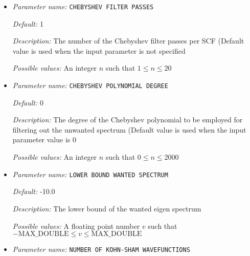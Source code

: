 \begin{itemize}
\item {\it Parameter name:} {\tt CHEBYSHEV FILTER PASSES}
\label{parameters:Eigen_2dsolver_2fChebyshev solver related parameters/CHEBYSHEV FILTER PASSES}
\label{parameters:Eigen_2dsolver_2fChebyshev_20solver_20related_20parameters/CHEBYSHEV_20FILTER_20PASSES}


{\it Default:} 1


{\it Description:} The number of the Chebyshev filter passes per SCF  (Default value is used when the input parameter is not specified


{\it Possible values:} An integer $n$ such that $1\leq n \leq 20$
\item {\it Parameter name:} {\tt CHEBYSHEV POLYNOMIAL DEGREE}
\label{parameters:Eigen_2dsolver_2fChebyshev solver related parameters/CHEBYSHEV POLYNOMIAL DEGREE}
\label{parameters:Eigen_2dsolver_2fChebyshev_20solver_20related_20parameters/CHEBYSHEV_20POLYNOMIAL_20DEGREE}


{\it Default:} 0


{\it Description:} The degree of the Chebyshev polynomial to be employed for filtering out the unwanted spectrum (Default value is used when the input parameter value is 0


{\it Possible values:} An integer $n$ such that $0\leq n \leq 2000$
\item {\it Parameter name:} {\tt LOWER BOUND WANTED SPECTRUM}
\label{parameters:Eigen_2dsolver_2fChebyshev solver related parameters/LOWER BOUND WANTED SPECTRUM}
\label{parameters:Eigen_2dsolver_2fChebyshev_20solver_20related_20parameters/LOWER_20BOUND_20WANTED_20SPECTRUM}


{\it Default:} -10.0


{\it Description:} The lower bound of the wanted eigen spectrum


{\it Possible values:} A floating point number $v$ such that $-\text{MAX\_DOUBLE} \leq v \leq \text{MAX\_DOUBLE}$
\item {\it Parameter name:} {\tt NUMBER OF KOHN-SHAM WAVEFUNCTIONS}
\label{parameters:Eigen_2dsolver_2fChebyshev solver related parameters/NUMBER OF KOHN_2dSHAM WAVEFUNCTIONS}
\label{parameters:Eigen_2dsolver_2fChebyshev_20solver_20related_20parameters/NUMBER_20OF_20KOHN_2dSHAM_20WAVEFUNCTIONS}



\end{itemize}
